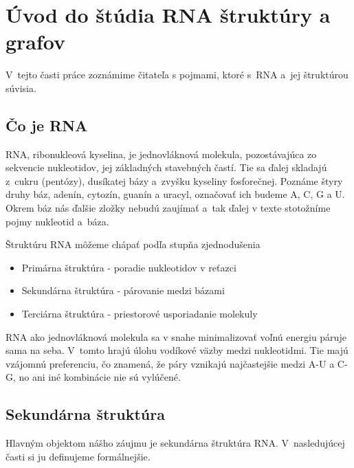 \renewcommand{\SS}{\mathbb{S}}
\newcommand{\Par}[2]{\mbox{$( #1, #2 )$}}
\usetikzlibrary{positioning, shapes, trees, graphs} %
\newcommand{\scale}{0.6}

\newcommand{\tree}[1]{\ensuremath{#1}}

\chapter{Úvod do štúdia RNA štruktúry a grafov}

V~tejto časti práce zoznámime čitateľa s pojmami, ktoré s~RNA a~jej
štruktúrou súvisia.




\section{Čo je RNA}

RNA, ribonukleová kyselina, je jednovláknová molekula, pozostávajúca
zo sekvencie nukleotidov, jej základných stavebných častí.
Tie sa ďalej skladajú z~cukru (pentózy), dusíkatej bázy a~zvyšku
kyseliny fosforečnej. Poznáme štyry druhy báz,
adenín, cytozín, guanín a uracyl, označovať ich budeme A, C, G a U.
Okrem báz nás ďalšie zložky nebudú zaujímať a~tak ďalej v texte stotožníme
pojmy nukleotid a~báza.

Štruktúru RNA môžeme chápať podľa stupňa zjednodušenia
\begin{itemize}
  \item Primárna štruktúra - poradie nukleotidov v reťazci
  \item Sekundárna štruktúra - párovanie medzi bázami
  \item Terciárna štruktúra - priestorové usporiadanie molekuly
\end{itemize}

RNA ako jednovláknová molekula sa v snahe minimalizovať voľnú energiu páruje sama na seba.
V~tomto hrajú úlohu vodíkové väzby medzi nukleotidmi. Tie majú vzájomnú preferenciu,
čo znamená, že páry vznikajú najčastejšie medzi A-U a C-G, no ani iné
kombinácie nie sú vylúčené. 




\section{Sekundárna štruktúra}

Hlavným objektom nášho záujmu je sekundárna štruktúra RNA. V~nasledujúcej
časti si ju definujeme formálnejšie.

